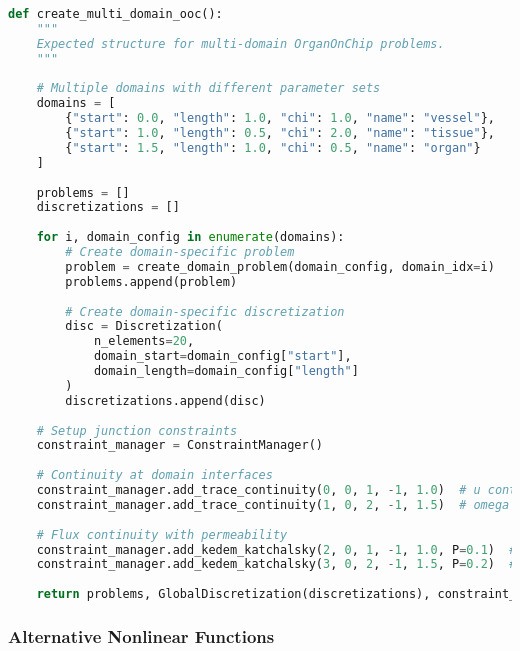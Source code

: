 \begin{lstlisting}[language=Python, caption=Expected Multi-Domain Problem Structure]
def create_multi_domain_ooc():
    """
    Expected structure for multi-domain OrganOnChip problems.
    """
    
    # Multiple domains with different parameter sets
    domains = [
        {"start": 0.0, "length": 1.0, "chi": 1.0, "name": "vessel"},
        {"start": 1.0, "length": 0.5, "chi": 2.0, "name": "tissue"},
        {"start": 1.5, "length": 1.0, "chi": 0.5, "name": "organ"}
    ]
    
    problems = []
    discretizations = []
    
    for i, domain_config in enumerate(domains):
        # Create domain-specific problem
        problem = create_domain_problem(domain_config, domain_idx=i)
        problems.append(problem)
        
        # Create domain-specific discretization
        disc = Discretization(
            n_elements=20,
            domain_start=domain_config["start"],
            domain_length=domain_config["length"]
        )
        discretizations.append(disc)
    
    # Setup junction constraints
    constraint_manager = ConstraintManager()
    
    # Continuity at domain interfaces
    constraint_manager.add_trace_continuity(0, 0, 1, -1, 1.0)  # u continuity
    constraint_manager.add_trace_continuity(1, 0, 2, -1, 1.5)  # omega continuity
    
    # Flux continuity with permeability
    constraint_manager.add_kedem_katchalsky(2, 0, 1, -1, 1.0, P=0.1)  # v coupling
    constraint_manager.add_kedem_katchalsky(3, 0, 2, -1, 1.5, P=0.2)  # phi coupling
    
    return problems, GlobalDiscretization(discretizations), constraint_manager, "Multi-Domain OoC"
\end{lstlisting}

\subsubsection{Alternative Nonlinear Functions}

